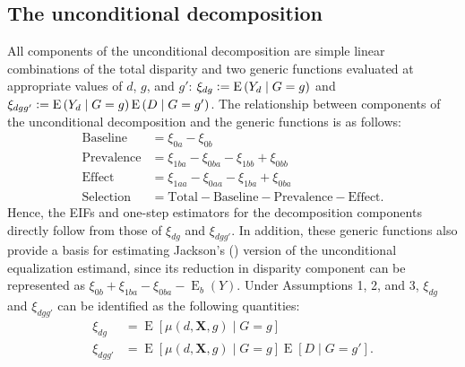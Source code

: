 \documentclass[12pt,a4paper]{article}
\newcommand{\E}{\operatorname{E}}
\def\X{{\boldsymbol X}}
\newcommand{\defeq}{\vcentcolon=}
\begin{document}
\subsection{The unconditional decomposition}
All components of the unconditional decomposition are simple linear combinations of the total disparity and two generic functions evaluated at appropriate values of $d$, $g$, and $g'$: $\xi_{dg} \defeq \E \left(Y_d \mid G=g  \right)$ and $\xi_{dgg'} \defeq \E \left(Y_d \mid G=g \right)\E \left(D \mid G=g' \right)$. The relationship between components of the unconditional decomposition and the generic functions is as follows:
\begin{align*}
    \text{Baseline} &= \xi_{0a}-\xi_{0b}  \\
    \text{Prevalence} &= \xi_{1ba}-\xi_{0ba}-\xi_{1bb}+\xi_{0bb} \\
    \text{Effect} &= \xi_{1aa}-\xi_{0aa} - \xi_{1ba}+\xi_{0ba} \\
    \text{Selection} &= \text{Total} - \text{Baseline} - \text{Prevalence} - \text{Effect} .
\end{align*}
Hence, the EIFs and one-step estimators for the decomposition components directly follow from those of $\xi_{dg}$ and $\xi_{dgg'}$. In addition, these generic functions also provide a basis for estimating Jackson's (\citeyear{jackson_decomposition_2018}) version of the unconditional equalization estimand, since its reduction in disparity component can be represented as $\xi_{0b} + \xi_{1ba}-\xi_{0ba}-\E_b(Y)$. Under Assumptions 1, 2, and 3, $\xi_{dg}$ and $\xi_{dgg'}$ can be identified as the following quantities:
\begin{align*}
    \xi_{dg} &= \E \left[\mu(d,\X,g) \mid G=g \right] \\
    \xi_{dgg'} &= \E \left[\mu(d,\X,g) \mid G=g \right] \E \left[D \mid G=g' \right].
\end{align*}
\end{document}
